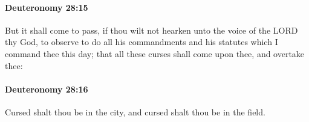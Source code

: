 		\paragraph{Deuteronomy 28:15} %
			\label{DEUTERONOMY-28-15}

			But it shall come to pass, if thou wilt not hearken unto the voice of the LORD thy God, to observe to do all his commandments and his statutes which I command thee this day; that all these curses shall come upon thee, and overtake thee:


		\paragraph{Deuteronomy 28:16} %
			\label{DEUTERONOMY-28-16}

			Cursed shalt thou be in the city, and cursed shalt thou be in the field.


